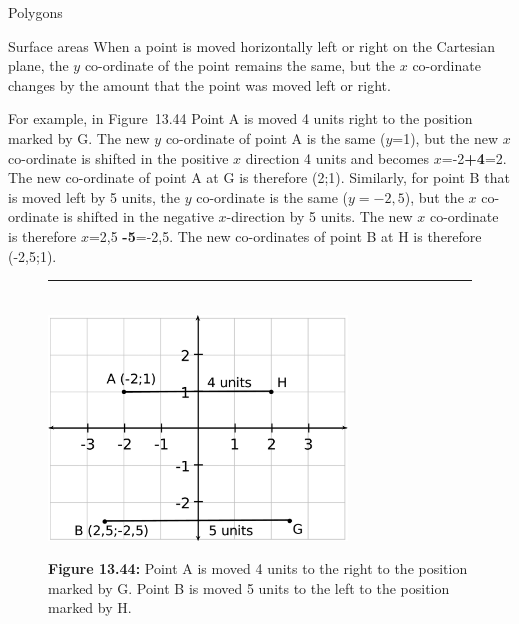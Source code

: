 \begin{exercises}{Polygons}
\begin{exercises}{Surface areas }
        \label{m39358*id70955}When a point is moved horizontally left or right on the Cartesian plane, the $y$ co-ordinate of the point remains the same, but the $x$ co-ordinate changes by the amount that the point was moved left or right.\par 
        \label{m39358*id70977}For example, in Figure~13.44 Point A is moved 4 units right to the position marked by G. The new $y$ co-ordinate of point A is the same ($y$=1), but the new $x$ co-ordinate is shifted in the positive $x$ direction 4 units and becomes $x$=-2\textbf{+4}=2. The new co-ordinate of point A at G is therefore (2;1). Similarly, for point B that is moved left by 5 units, the $y$ co-ordinate is the same ($y=-2,5$), but the $x$ co-ordinate is shifted in the negative $x$-direction by 5 units. The new $x$ co-ordinate is therefore $x$=2,5 \textbf{-5}=-2,5. The new co-ordinates of point B at H is therefore (-2,5;1).\par 
        
    \setcounter{subfigure}{0}


	\begin{figure}[H] %
    \begin{center}
    \rule[.1in]{\figurerulewidth}{.005in} \\
        \label{m39358*uid7134!!!underscore!!!media}\label{m39358*uid71!!!underscore!!!printimage}\includegraphics[width=300px]{col11306.imgs/m39358_MG10C14_025.png} %
        
      \vspace{2pt}
    \vspace{\rubberspace}\par \begin{cnxcaption}
	  \small \textbf{Figure 13.44: }Point A is moved 4 units to the right to the position marked by G. Point B is moved 5 units to the left to the position marked by H.
	\end{cnxcaption}
      

\end{center}
\end{figure}
\end{exercises}
\end{exercises}
